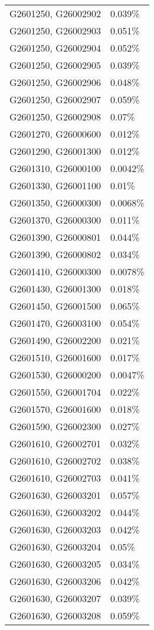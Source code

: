 \begin{longtable}[]{@{}ll@{}}
G2601250, G26002902 & 0.039\% \\
G2601250, G26002903 & 0.051\% \\
G2601250, G26002904 & 0.052\% \\
G2601250, G26002905 & 0.039\% \\
G2601250, G26002906 & 0.048\% \\
G2601250, G26002907 & 0.059\% \\
G2601250, G26002908 & 0.07\% \\
G2601270, G26000600 & 0.012\% \\
G2601290, G26001300 & 0.012\% \\
G2601310, G26000100 & 0.0042\% \\
G2601330, G26001100 & 0.01\% \\
G2601350, G26000300 & 0.0068\% \\
G2601370, G26000300 & 0.011\% \\
G2601390, G26000801 & 0.044\% \\
G2601390, G26000802 & 0.034\% \\
G2601410, G26000300 & 0.0078\% \\
G2601430, G26001300 & 0.018\% \\
G2601450, G26001500 & 0.065\% \\
G2601470, G26003100 & 0.054\% \\
G2601490, G26002200 & 0.021\% \\
G2601510, G26001600 & 0.017\% \\
G2601530, G26000200 & 0.0047\% \\
G2601550, G26001704 & 0.022\% \\
G2601570, G26001600 & 0.018\% \\
G2601590, G26002300 & 0.027\% \\
G2601610, G26002701 & 0.032\% \\
G2601610, G26002702 & 0.038\% \\
G2601610, G26002703 & 0.041\% \\
G2601630, G26003201 & 0.057\% \\
G2601630, G26003202 & 0.044\% \\
G2601630, G26003203 & 0.042\% \\
G2601630, G26003204 & 0.05\% \\
G2601630, G26003205 & 0.034\% \\
G2601630, G26003206 & 0.042\% \\
G2601630, G26003207 & 0.039\% \\
G2601630, G26003208 & 0.059\% \\

\end{longtable}
